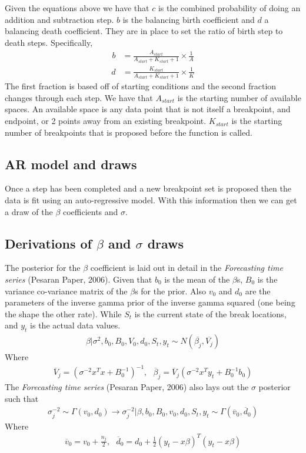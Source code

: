 \documentclass[submit]{smj}
\begin{document}
Given the equations above we have that $c$ is the combined probability of doing an addition and subtraction step. $b$ is the balancing birth coefficient and $d$ a balancing death coefficient. They are in place to set the ratio of birth step to death steps. Specifically,
\begin{align*}
b &= \frac{A_{start}}{A_{start} + K_{start} + 1} \times \frac{1}{A}
\end{align*}
\begin{align*}
d &= \frac{K_{start}}{A_{start} + K_{start} + 1} \times \frac{1}{K}
\end{align*}
The first fraction is based off of starting conditions and the second fraction changes through each step. We have that $A_{start}$ is the starting number of available spaces. An available space is any data point that is not itself a breakpoint, and endpoint, or 2 points away from an existing breakpoint.  $K_{start}$ is the starting number of breakpoints that is proposed before the function is called. 


\subsection{AR model and draws}
Once a step has been completed and a new breakpoint set is proposed then the data is fit using an auto-regressive model.  With this information then we can get a draw of the $\beta$ coefficients and $\sigma$.

\subsection{Derivations of $\beta$ and $\sigma$ draws}

The posterior for the $\beta$ coefficient is laid out in detail in the \textit{Forecasting time series} (Pesaran Paper, 2006). 
Given that $b_0$ is the mean of the $\beta$s, 
$B_0$ is the variance co-variance matrix of the $\beta$s for the prior. Also $v_0$ and $d_0$ are the parameters of the inverse gamma prior of the inverse gamma squared (one being the shape the other rate). While $S_t$ is the current state of the break locations, and $y_t$ is the actual data values. 
\begin{align*}
\beta | \sigma^2, b_0, B_0, V_0, d_0 , S_{t}, y_{t} \sim N( \overline{\beta_j } , \overline{V_j} )
\end{align*}
Where 
\begin{align*}
\overline{V}_j = (\sigma^{-2}x^Tx + B_0^{-1})^{-1}, \ \ \  \overline{\beta}_j = \overline{V}_j(\sigma^{-2}x^Ty_t + B_0^{-1}b_0)
\end{align*}
The \textit{Forecasting time series} (Pesaran Paper, 2006) also lays out the $\sigma$ posterior such that 
\begin{align*}
\sigma_j^{-2} \sim  \Gamma(v_0, d_0) \longrightarrow \sigma^{-2}_j | \beta, b_0, B_0, v_0, d_0 , S_{t}, y_{t} \sim \Gamma ( \overline{v}_0,  \overline{d}_0)
\end{align*}
Where 
\begin{align*}
\overline{v}_0 = v_0 + \frac{n_j}{2} , \ \ \  \overline{d}_0 = d_0 + \frac{1}{2}(y_t-x\beta)^T(y_t-x\beta)
\end{align*}
\end{document}
